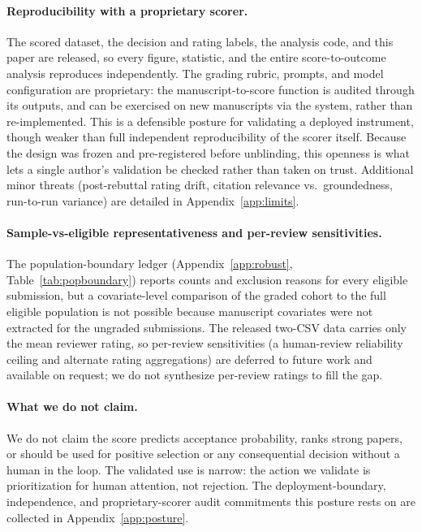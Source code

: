 \paragraph{Reproducibility with a proprietary scorer.}
The scored dataset, the decision and rating labels, the analysis code, and this paper
are released, so every figure, statistic, and the entire score-to-outcome analysis
reproduces independently. The grading rubric, prompts, and model configuration are
proprietary: the manuscript-to-score function is audited through its outputs, and can
be exercised on new manuscripts via the system, rather than re-implemented. This is a
defensible posture for validating a deployed instrument, though weaker than full
independent reproducibility of the scorer itself. Because the design was frozen and
pre-registered before unblinding, this openness is what lets a single author's
validation be checked rather than taken on trust. Additional minor threats
(post-rebuttal rating drift, citation relevance vs.\ groundedness, run-to-run variance)
are detailed in Appendix~\ref{app:limits}.

\paragraph{Sample-vs-eligible representativeness and per-review sensitivities.}
The population-boundary ledger (Appendix~\ref{app:robust}, Table~\ref{tab:popboundary})
reports counts and exclusion reasons for every eligible submission, but a
covariate-level comparison of the graded cohort to the full eligible population is not
possible because manuscript covariates were not extracted for the ungraded submissions.
The released two-CSV data carries only the mean reviewer rating, so per-review
sensitivities (a human-review reliability ceiling and alternate rating aggregations)
are deferred to future work and available on request; we do not synthesize per-review
ratings to fill the gap.

\paragraph{What we do not claim.}
We do not claim the score predicts acceptance probability, ranks strong papers, or
should be used for positive selection or any consequential decision without a human in
the loop. The validated use is narrow: the action we validate is prioritization for
human attention, not rejection. The deployment-boundary, independence, and
proprietary-scorer audit commitments this posture rests on are collected in
Appendix~\ref{app:posture}.
